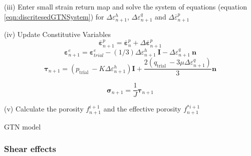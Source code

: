\documentclass[sn-mathphys,Numbered,draft]{sn-jnl}%
\begin{document}
\begin{algorithm}[H]
(iii) Enter small strain return map and solve the system of equations (equation \ref{eqn:discritesedGTNSystem}) for $\Delta {\varepsilon}_{n+1}^h$, $\Delta {\varepsilon}_{n+1}^q$ and $\Delta \overline{{\varepsilon}}^p_{n+1}$


(iv) Update Constitutive Variables
\begin{equation}
\overline{\boldsymbol{\varepsilon}}^p_{n+1}=\overline{\boldsymbol{\varepsilon}}^p_{n}+\Delta \overline{\boldsymbol{\varepsilon}}^p_{n+1}\nonumber
\end{equation}
\begin{equation}
\boldsymbol{\varepsilon}^{e}_{n+1}=\boldsymbol{\varepsilon}^{e}_{trial}-(1/3)\Delta {\varepsilon}_{n+1}^h\ \mathbf{I}-\Delta {\varepsilon}_{n+1}^q\ \mathbf{n}\nonumber
\end{equation}
\begin{equation}
\boldsymbol{\tau}_{n+1}=(p_{\text {trial }}-K \Delta \varepsilon_{n+1}^h)\mathbf{I}+\frac{2(q_{\text {trial }}-3 \mu \Delta \varepsilon_{n+1}^q)}{3}\mathbf{n} \nonumber
\end{equation}

\begin{equation}
\boldsymbol{\sigma}_{n+1}=\frac{1}{J}\boldsymbol{\tau}_{n+1}\nonumber
\end{equation}

(v) Calculate the porosity $f^{i+1}_{n+1}$ and the effective porosity $f^{*i+1}_{n+1}$
\caption{GTN model}
\end{algorithm}


\subsubsection{Shear effects}
\end{document}
